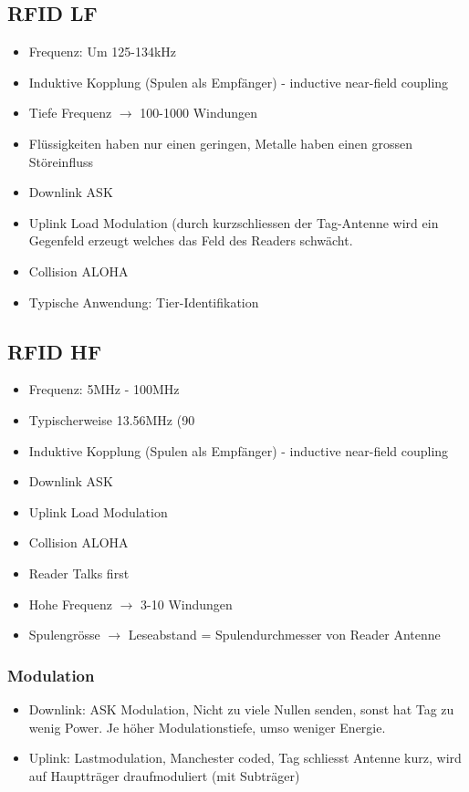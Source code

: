 \subsection{RFID LF}
	\begin{itemize}
		\item Frequenz: Um 125-134kHz
		\item Induktive Kopplung (Spulen als Empfänger) - inductive near-field coupling
		\item Tiefe Frequenz $\rightarrow$ 100-1000 Windungen
		\item Flüssigkeiten haben nur einen geringen, Metalle haben einen grossen Störeinfluss
		\item Downlink ASK
		\item Uplink Load Modulation (durch kurzschliessen der Tag-Antenne wird ein Gegenfeld erzeugt welches das Feld des Readers schwächt.
		\item Collision ALOHA
		\item Typische Anwendung: Tier-Identifikation
	\end{itemize}
	
\subsection{RFID HF}
	\begin{itemize}
		\item Frequenz: 5MHz - 100MHz
		\item Typischerweise 13.56MHz (90%
		\item Induktive Kopplung (Spulen als Empfänger) - inductive near-field coupling
		\item Downlink ASK
		\item Uplink Load Modulation
		\item Collision ALOHA
		\item Reader Talks first
		\item Hohe Frequenz $\rightarrow$ 3-10 Windungen
		\item Spulengrösse $\rightarrow$ Leseabstand = Spulendurchmesser von Reader Antenne
	\end{itemize}
\subsubsection{Modulation}
	\begin{itemize}
		\item Downlink: ASK Modulation, Nicht zu viele Nullen senden, sonst hat Tag zu wenig Power. Je höher Modulationstiefe, umso weniger Energie. 
		\item Uplink: Lastmodulation, Manchester coded, Tag schliesst Antenne kurz, wird auf Hauptträger draufmoduliert (mit Subträger)
	\end{itemize}
	
